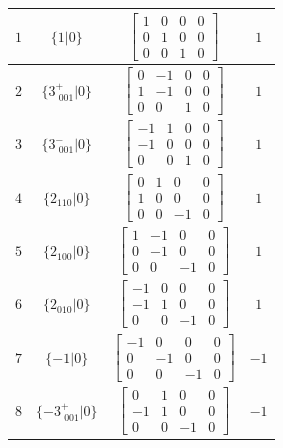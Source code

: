 \documentclass[fleqn,8pt]{jsarticle}
\begin{document}
\begin{longtable}{cccc}
$ 1 $ & $ \{1|0\} $ & $ \begin{bmatrix} 1 & 0 & 0 & 0 \\ 0 & 1 & 0 & 0 \\ 0 & 0 & 1 & 0 \end{bmatrix} $ & $ 1 $ \\ \hline
$ 2 $ & $ \{3^{+}_{\,\,001}|0\} $ & $ \begin{bmatrix} 0 & -1 & 0 & 0 \\ 1 & -1 & 0 & 0 \\ 0 & 0 & 1 & 0 \end{bmatrix} $ & $ 1 $ \\ \hline
$ 3 $ & $ \{3^{-}_{\,\,001}|0\} $ & $ \begin{bmatrix} -1 & 1 & 0 & 0 \\ -1 & 0 & 0 & 0 \\ 0 & 0 & 1 & 0 \end{bmatrix} $ & $ 1 $ \\ \hline
$ 4 $ & $ \{2{}_{110}|0\} $ & $ \begin{bmatrix} 0 & 1 & 0 & 0 \\ 1 & 0 & 0 & 0 \\ 0 & 0 & -1 & 0 \end{bmatrix} $ & $ 1 $ \\ \hline
$ 5 $ & $ \{2{}_{100}|0\} $ & $ \begin{bmatrix} 1 & -1 & 0 & 0 \\ 0 & -1 & 0 & 0 \\ 0 & 0 & -1 & 0 \end{bmatrix} $ & $ 1 $ \\ \hline
$ 6 $ & $ \{2{}_{010}|0\} $ & $ \begin{bmatrix} -1 & 0 & 0 & 0 \\ -1 & 1 & 0 & 0 \\ 0 & 0 & -1 & 0 \end{bmatrix} $ & $ 1 $ \\ \hline
$ 7 $ & $ \{-1|0\} $ & $ \begin{bmatrix} -1 & 0 & 0 & 0 \\ 0 & -1 & 0 & 0 \\ 0 & 0 & -1 & 0 \end{bmatrix} $ & $ -1 $ \\ \hline
$ 8 $ & $ \{-3^{+}_{\,\,001}|0\} $ & $ \begin{bmatrix} 0 & 1 & 0 & 0 \\ -1 & 1 & 0 & 0 \\ 0 & 0 & -1 & 0 \end{bmatrix} $ & $ -1 $ \\ \hline

\end{longtable}
\end{document}
